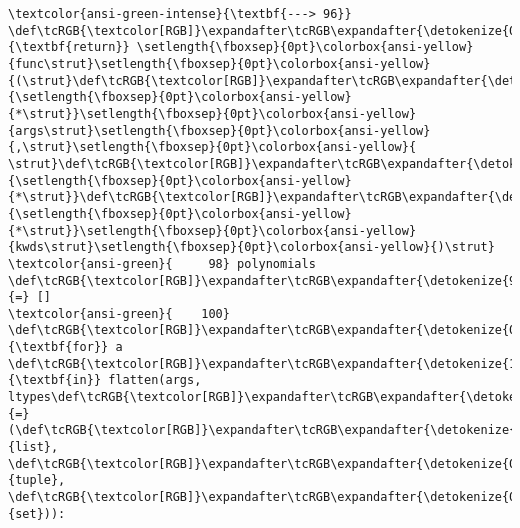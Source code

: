\documentclass[11pt]{article}
\begin{document}
\begin{Verbatim}[commandchars=\\\{\}, frame=single, framerule=2mm, rulecolor=\color{outerrorbackground}]
\textcolor{ansi-green-intense}{\textbf{---> 96}}     \def\tcRGB{\textcolor[RGB]}\expandafter\tcRGB\expandafter{\detokenize{0,135,0}}{\textbf{return}} \setlength{\fboxsep}{0pt}\colorbox{ansi-yellow}{func\strut}\setlength{\fboxsep}{0pt}\colorbox{ansi-yellow}{(\strut}\def\tcRGB{\textcolor[RGB]}\expandafter\tcRGB\expandafter{\detokenize{98,98,98}}{\setlength{\fboxsep}{0pt}\colorbox{ansi-yellow}{*\strut}}\setlength{\fboxsep}{0pt}\colorbox{ansi-yellow}{args\strut}\setlength{\fboxsep}{0pt}\colorbox{ansi-yellow}{,\strut}\setlength{\fboxsep}{0pt}\colorbox{ansi-yellow}{ \strut}\def\tcRGB{\textcolor[RGB]}\expandafter\tcRGB\expandafter{\detokenize{98,98,98}}{\setlength{\fboxsep}{0pt}\colorbox{ansi-yellow}{*\strut}}\def\tcRGB{\textcolor[RGB]}\expandafter\tcRGB\expandafter{\detokenize{98,98,98}}{\setlength{\fboxsep}{0pt}\colorbox{ansi-yellow}{*\strut}}\setlength{\fboxsep}{0pt}\colorbox{ansi-yellow}{kwds\strut}\setlength{\fboxsep}{0pt}\colorbox{ansi-yellow}{)\strut}
\textcolor{ansi-green}{     98} polynomials \def\tcRGB{\textcolor[RGB]}\expandafter\tcRGB\expandafter{\detokenize{98,98,98}}{=} []
\textcolor{ansi-green}{    100} \def\tcRGB{\textcolor[RGB]}\expandafter\tcRGB\expandafter{\detokenize{0,135,0}}{\textbf{for}} a \def\tcRGB{\textcolor[RGB]}\expandafter\tcRGB\expandafter{\detokenize{175,0,255}}{\textbf{in}} flatten(args, ltypes\def\tcRGB{\textcolor[RGB]}\expandafter\tcRGB\expandafter{\detokenize{98,98,98}}{=}(\def\tcRGB{\textcolor[RGB]}\expandafter\tcRGB\expandafter{\detokenize{0,135,0}}{list}, \def\tcRGB{\textcolor[RGB]}\expandafter\tcRGB\expandafter{\detokenize{0,135,0}}{tuple}, \def\tcRGB{\textcolor[RGB]}\expandafter\tcRGB\expandafter{\detokenize{0,135,0}}{set})):


\end{Verbatim}
\end{document}
